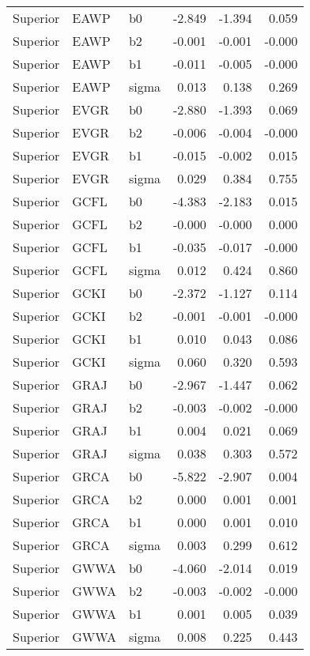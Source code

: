 \begin{table}[ht]
\begin{center}
\begin{tabular}{lllrrr}
  Superior & EAWP & b0 & -2.849 & -1.394 & 0.059 \\ 
  Superior & EAWP & b2 & -0.001 & -0.001 & -0.000 \\ 
  Superior & EAWP & b1 & -0.011 & -0.005 & -0.000 \\ 
  Superior & EAWP & sigma & 0.013 & 0.138 & 0.269 \\ 
  Superior & EVGR & b0 & -2.880 & -1.393 & 0.069 \\ 
  Superior & EVGR & b2 & -0.006 & -0.004 & -0.000 \\ 
  Superior & EVGR & b1 & -0.015 & -0.002 & 0.015 \\ 
  Superior & EVGR & sigma & 0.029 & 0.384 & 0.755 \\ 
  Superior & GCFL & b0 & -4.383 & -2.183 & 0.015 \\ 
  Superior & GCFL & b2 & -0.000 & -0.000 & 0.000 \\ 
  Superior & GCFL & b1 & -0.035 & -0.017 & -0.000 \\ 
  Superior & GCFL & sigma & 0.012 & 0.424 & 0.860 \\ 
  Superior & GCKI & b0 & -2.372 & -1.127 & 0.114 \\ 
  Superior & GCKI & b2 & -0.001 & -0.001 & -0.000 \\ 
  Superior & GCKI & b1 & 0.010 & 0.043 & 0.086 \\ 
  Superior & GCKI & sigma & 0.060 & 0.320 & 0.593 \\ 
  Superior & GRAJ & b0 & -2.967 & -1.447 & 0.062 \\ 
  Superior & GRAJ & b2 & -0.003 & -0.002 & -0.000 \\ 
  Superior & GRAJ & b1 & 0.004 & 0.021 & 0.069 \\ 
  Superior & GRAJ & sigma & 0.038 & 0.303 & 0.572 \\ 
  Superior & GRCA & b0 & -5.822 & -2.907 & 0.004 \\ 
  Superior & GRCA & b2 & 0.000 & 0.001 & 0.001 \\ 
  Superior & GRCA & b1 & 0.000 & 0.001 & 0.010 \\ 
  Superior & GRCA & sigma & 0.003 & 0.299 & 0.612 \\ 
  Superior & GWWA & b0 & -4.060 & -2.014 & 0.019 \\ 
  Superior & GWWA & b2 & -0.003 & -0.002 & -0.000 \\ 
  Superior & GWWA & b1 & 0.001 & 0.005 & 0.039 \\ 
  Superior & GWWA & sigma & 0.008 & 0.225 & 0.443 \\ 

\end{tabular}
\end{center}
\end{table}
